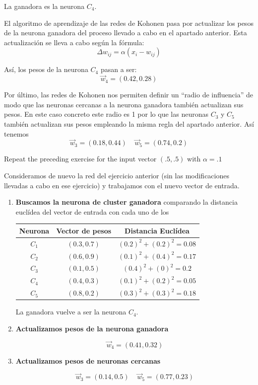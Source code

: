\begin{problem}[2]
La ganadora es la neurona $C_4$.

\spart

El algoritmo de aprendizaje de las redes de Kohonen pasa por actualizar los pesos de la neurona ganadora del proceso llevado a cabo en el apartado anterior. Esta actualización se lleva a cabo según la fórmula:
\[Δw_{ij} = α(x_i-w_{ij})\]

Así, los pesos de la neurona $C_4$ pasan a ser:
\[\vec{w}_4 = (0.42, 0.28)\]

\spart

Por último, las redes de Kohonen nos permiten definir un ``radio de influencia'' de modo que las neuronas cercanas a la neurona ganadora también actualizan sus pesos. En este caso concreto este radio es 1 por lo que las neuronas $C_3$ y $C_5$ también actualizan sus pesos empleando la misma regla del apartado anterior. Así tenemos
\[\vec{w}_3 = (0.18,0.44) \;\;\;\; \vec{w}_5=(0.74,0.2)\]

\end{problem}

\begin{problem}[3]
Repeat the preceding exercise for the input vector $(.5,.5)$ with $α=.1$

\solution
{}

Consideramos de nuevo la red del ejercicio anterior (sin las modificaciones llevadas a cabo en ese ejercicio) y trabajamos con el nuevo vector de entrada.

\begin{enumerate}
\item \textbf{Buscamos la neurona de cluster ganadora} comparando la distancia euclídea del vector de entrada con cada uno de los
\begin{center}
\begin{tabular}{|c|c|c|}
\hline
\textbf{Neurona}  & \textbf{Vector de pesos} & \textbf{Distancia Euclídea}\\
\hline
$C_1$ & $(0.3, 0.7)$ & $(0.2)^2 + (0.2)^2 = 0.08$\\
$C_2$ & $(0.6, 0.9)$ & $(0.1)^2 + (0.4)^2 =0.17$\\
$C_3$ & $(0.1, 0.5)$ & $(0.4)^2 + (0)^2 = 0.2$\\
$C_4$ & $(0.4, 0.3)$ & $(0.1)^2 + (0.2)^2 = 0.05$\\
$C_5$ & $(0.8, 0.2)$ & $(0.3)^2 + (0.3)^2 = 0.18$\\
\hline
\end{tabular}
\end{center}

La ganadora vuelve a ser la neurona $C_4$.

\item \textbf{Actualizamos pesos de la neurona ganadora}

\[\vec{w}_4 = (0.41,0.32)\]

\item \textbf{Actualizamos pesos de neuronas cercanas}

\[\vec{w}_3 = (0.14,0.5) \;\;\;\; \vec{w}_5 = (0.77,0.23) \]
\end{enumerate}


\end{problem}

